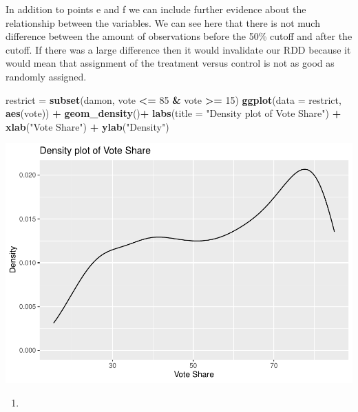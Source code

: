 \documentclass[
  12pt,
  landscape]{article}
\newenvironment{Shaded}{\begin{snugshade}}{\end{snugshade}}
\newcommand{\DataTypeTok}[1]{\textcolor[rgb]{0.13,0.29,0.53}{#1}}
\newcommand{\DecValTok}[1]{\textcolor[rgb]{0.00,0.00,0.81}{#1}}
\newcommand{\KeywordTok}[1]{\textcolor[rgb]{0.13,0.29,0.53}{\textbf{#1}}}
\newcommand{\NormalTok}[1]{#1}
\newcommand{\OperatorTok}[1]{\textcolor[rgb]{0.81,0.36,0.00}{\textbf{#1}}}
\newcommand{\StringTok}[1]{\textcolor[rgb]{0.31,0.60,0.02}{#1}}
\begin{document}
In addition to points e and f we can include further evidence about the
relationship between the variables. We can see here that there is not
much difference between the amount of observations before the 50\%
cutoff and after the cutoff. If there was a large difference then it
would invalidate our RDD because it would mean that assignment of the
treatment versus control is not as good as randomly assigned.

\begin{Shaded}
\begin{Highlighting}[]
\NormalTok{restrict =}\StringTok{ }\KeywordTok{subset}\NormalTok{(damon, vote }\OperatorTok{<=}\StringTok{ }\DecValTok{85} \OperatorTok{&}\StringTok{ }\NormalTok{vote }\OperatorTok{>=}\StringTok{ }\DecValTok{15}\NormalTok{)}
\KeywordTok{ggplot}\NormalTok{(}\DataTypeTok{data =}\NormalTok{ restrict, }\KeywordTok{aes}\NormalTok{(vote)) }\OperatorTok{+}
\StringTok{  }\KeywordTok{geom_density}\NormalTok{()}\OperatorTok{+}
\StringTok{  }\KeywordTok{labs}\NormalTok{(}\DataTypeTok{title =} \StringTok{"Density plot of Vote Share"}\NormalTok{) }\OperatorTok{+}
\StringTok{  }\KeywordTok{xlab}\NormalTok{(}\StringTok{"Vote Share"}\NormalTok{) }\OperatorTok{+}
\StringTok{  }\KeywordTok{ylab}\NormalTok{(}\StringTok{"Density"}\NormalTok{)}
\end{Highlighting}
\end{Shaded}

\includegraphics{Ogle_MicroMetricsAssignment_5_Q1_files/figure-latex/unnamed-chunk-6-1.pdf}

\begin{enumerate}
\def\labelenumi{(\alph{enumi})}
\setcounter{enumi}{7}
\item
\end{enumerate}
\end{document}
